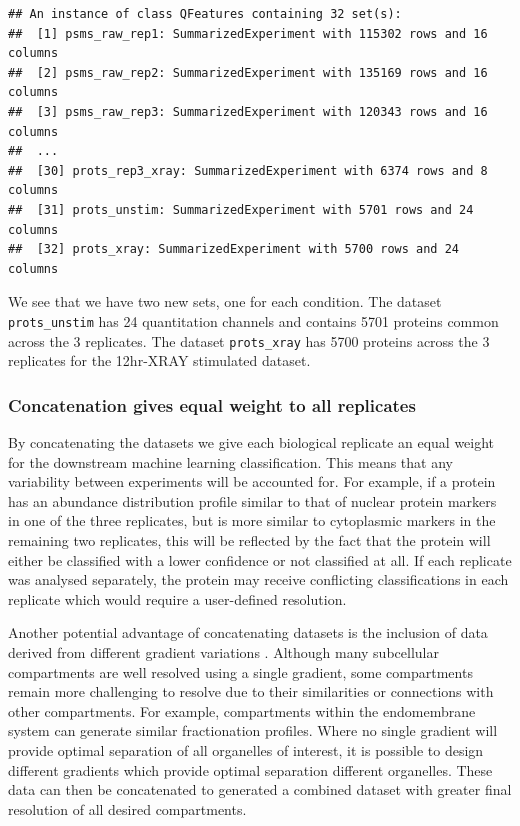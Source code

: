 \documentclass[9pt,a4paper,]{extarticle}
\begin{document}
\begin{verbatim}
## An instance of class QFeatures containing 32 set(s):
##  [1] psms_raw_rep1: SummarizedExperiment with 115302 rows and 16 columns 
##  [2] psms_raw_rep2: SummarizedExperiment with 135169 rows and 16 columns 
##  [3] psms_raw_rep3: SummarizedExperiment with 120343 rows and 16 columns 
##  ...
##  [30] prots_rep3_xray: SummarizedExperiment with 6374 rows and 8 columns 
##  [31] prots_unstim: SummarizedExperiment with 5701 rows and 24 columns 
##  [32] prots_xray: SummarizedExperiment with 5700 rows and 24 columns
\end{verbatim}

We see that we have two new sets, one for each condition. The dataset
\texttt{prots\_unstim} has 24 quantitation channels and contains 5701
proteins common across the 3 replicates. The dataset \texttt{prots\_xray} has
5700 proteins across the 3 replicates for the 12hr-XRAY
stimulated dataset.

\subsubsection{Concatenation gives equal weight to all replicates}\label{concatenation-gives-equal-weight-to-all-replicates}

By concatenating the datasets we give each biological replicate an equal weight
for the downstream machine learning classification. This means that any variability
between experiments will be accounted for. For example, if a
protein has an abundance distribution profile similar to that of nuclear protein
markers in one of the three replicates, but is more similar to cytoplasmic markers
in the remaining two replicates, this will be reflected by the fact that the
protein will either be classified with a lower confidence or not classified at
all. If each replicate was analysed separately, the protein may receive conflicting
classifications in each replicate which would require a user-defined resolution.

Another potential advantage of concatenating datasets is the inclusion of data
derived from different gradient variations \citep{Barylyuk2020, Trotter2010}. Although
many subcellular compartments are well resolved using a single gradient, some
compartments remain more challenging to resolve due to their similarities or
connections with other compartments. For example, compartments within the endomembrane
system can generate similar fractionation profiles. Where no single gradient will
provide optimal separation of all organelles of interest, it is possible to design
different gradients which provide optimal separation different organelles. These
data can then be concatenated to generated a combined dataset with greater final
resolution of all desired compartments.
\end{document}
